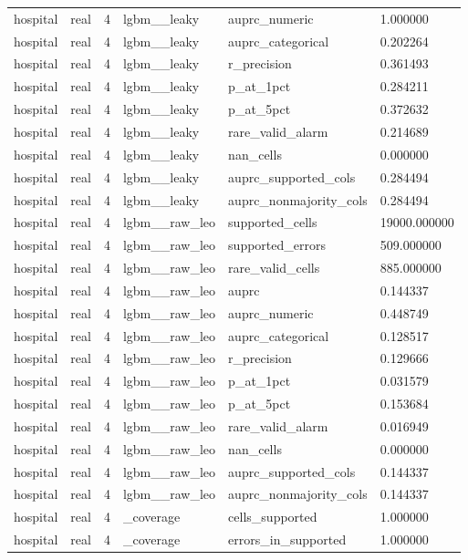 \begin{tabular}{llllll}
hospital & real & 4 & lgbm\_\_leaky & auprc\_numeric & 1.000000 \\
hospital & real & 4 & lgbm\_\_leaky & auprc\_categorical & 0.202264 \\
hospital & real & 4 & lgbm\_\_leaky & r\_precision & 0.361493 \\
hospital & real & 4 & lgbm\_\_leaky & p\_at\_1pct & 0.284211 \\
hospital & real & 4 & lgbm\_\_leaky & p\_at\_5pct & 0.372632 \\
hospital & real & 4 & lgbm\_\_leaky & rare\_valid\_alarm & 0.214689 \\
hospital & real & 4 & lgbm\_\_leaky & nan\_cells & 0.000000 \\
hospital & real & 4 & lgbm\_\_leaky & auprc\_supported\_cols & 0.284494 \\
hospital & real & 4 & lgbm\_\_leaky & auprc\_nonmajority\_cols & 0.284494 \\
hospital & real & 4 & lgbm\_\_raw\_leo & supported\_cells & 19000.000000 \\
hospital & real & 4 & lgbm\_\_raw\_leo & supported\_errors & 509.000000 \\
hospital & real & 4 & lgbm\_\_raw\_leo & rare\_valid\_cells & 885.000000 \\
hospital & real & 4 & lgbm\_\_raw\_leo & auprc & 0.144337 \\
hospital & real & 4 & lgbm\_\_raw\_leo & auprc\_numeric & 0.448749 \\
hospital & real & 4 & lgbm\_\_raw\_leo & auprc\_categorical & 0.128517 \\
hospital & real & 4 & lgbm\_\_raw\_leo & r\_precision & 0.129666 \\
hospital & real & 4 & lgbm\_\_raw\_leo & p\_at\_1pct & 0.031579 \\
hospital & real & 4 & lgbm\_\_raw\_leo & p\_at\_5pct & 0.153684 \\
hospital & real & 4 & lgbm\_\_raw\_leo & rare\_valid\_alarm & 0.016949 \\
hospital & real & 4 & lgbm\_\_raw\_leo & nan\_cells & 0.000000 \\
hospital & real & 4 & lgbm\_\_raw\_leo & auprc\_supported\_cols & 0.144337 \\
hospital & real & 4 & lgbm\_\_raw\_leo & auprc\_nonmajority\_cols & 0.144337 \\
hospital & real & 4 & \_coverage & cells\_supported & 1.000000 \\
hospital & real & 4 & \_coverage & errors\_in\_supported & 1.000000 \\

\end{tabular}

